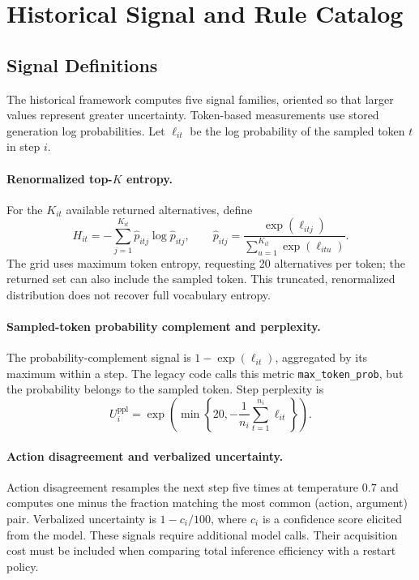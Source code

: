 \documentclass{article}
\begin{document}
\clearpage
\appendix
\section{Historical Signal and Rule Catalog}\label{app:signals}
\subsection{Signal Definitions}
The historical framework computes five signal families, oriented so that larger
values represent greater uncertainty. Token-based measurements use stored
generation log probabilities. Let $\ell_{it}$ be the log probability of the
sampled token $t$ in step $i$.

\paragraph{Renormalized top-$K$ entropy.}
For the $K_{it}$ available returned alternatives, define
\begin{equation}
  H_{it}=-\sum_{j=1}^{K_{it}}\widehat p_{itj}\log\widehat p_{itj},
  \qquad \widehat p_{itj}=\frac{\exp(\ell_{itj})}
                               {\sum_{u=1}^{K_{it}}\exp(\ell_{itu})}.
\end{equation}
The grid uses maximum token entropy, requesting 20 alternatives per token;
the returned set can also include the sampled token. This truncated,
renormalized distribution does not recover full vocabulary entropy.

\paragraph{Sampled-token probability complement and perplexity.}
The probability-complement signal is $1-\exp(\ell_{it})$, aggregated by its
maximum within a step. The legacy code calls this metric
\texttt{max\_token\_prob}, but the probability belongs to the sampled token.
Step perplexity is
\begin{equation}
  U_i^{\mathrm{ppl}}=
  \exp\!\left(\min\left\{20,-\frac{1}{n_i}
                           \sum_{t=1}^{n_i}\ell_{it}\right\}\right).
\end{equation}

\paragraph{Action disagreement and verbalized uncertainty.}
Action disagreement resamples the next step five times at temperature
$0.7$ and computes one minus the fraction matching the most common
(action, argument) pair. Verbalized uncertainty is $1-c_i/100$, where
$c_i$ is a confidence score elicited from the model. These signals require
additional model calls. Their acquisition cost must be included when
comparing total inference efficiency with a restart policy.
\end{document}
